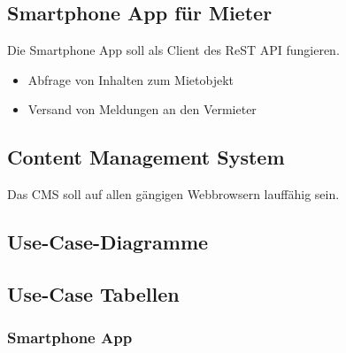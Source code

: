 \documentclass[a4paper]{article}
\begin{document}
	\subsection{Smartphone App für Mieter}
	Die Smartphone App soll als Client des ReST API fungieren.
	\begin{itemize}
		\item Abfrage von Inhalten zum Mietobjekt
		\item Versand von Meldungen an den Vermieter
	\end{itemize}
	\subsection{Content Management System}
	Das CMS soll auf allen gängigen Webbrowsern lauffähig sein.
	\subsection{Use-Case-Diagramme}
	\subsection{Use-Case Tabellen}
	\subsubsection{Smartphone App}
\end{document}
